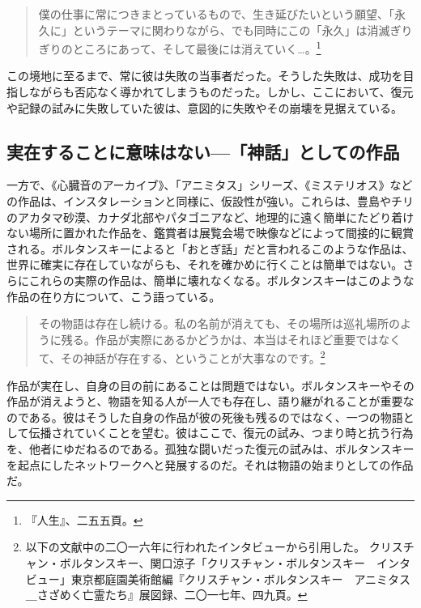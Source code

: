 \documentclass[b5j,twoside,twocolumn]{utarticle}
\begin{document}
\begin{quote}
僕の仕事に常につきまとっているもので、生き延びたいという願望、「永久に」というテーマに関わりながら、でも同時にこの「永久」は消滅ぎりぎりのところにあって、そして最後には消えていく…。\footnote{『人生』、二五五頁。}
\end{quote}


この境地に至るまで、常に彼は失敗の当事者だった。そうした失敗は、成功を目指しながらも否応なく導かれてしまうものだった。しかし、ここにおいて、復元や記録の試みに失敗していた彼は、意図的に失敗やその崩壊を見据えている。

\subsection{実在することに意味はない—「神話」としての作品}
一方で、《心臓音のアーカイブ》、「アニミタス」シリーズ、《ミステリオス》などの作品は、インスタレーションと同様に、仮設性が強い。これらは、豊島やチリのアカタマ砂漠、カナダ北部やパタゴニアなど、地理的に遠く簡単にたどり着けない場所に置かれた作品を、鑑賞者は展覧会場で映像などによって間接的に観賞される。ボルタンスキーによると「おとぎ話」だと言われるこのような作品は、世界に確実に存在していながらも、それを確かめに行くことは簡単ではない。さらにこれらの実際の作品は、簡単に壊れなくなる。ボルタンスキーはこのような作品の在り方について、こう語っている。
\begin{quote}
その物語は存在し続ける。私の名前が消えても、その場所は巡礼場所のように残る。作品が実際にあるかどうかは、本当はそれほど重要ではなくて、その神話が存在する、ということが大事なのです。\footnote{以下の文献中の二〇一六年に行われたインタビューから引用した。
クリスチャン・ボルタンスキー、関口涼子「クリスチャン・ボルタンスキー　インタビュー」東京都庭園美術館編『クリスチャン・ボルタンスキー　アニミタス＿さざめく亡霊たち』展図録、二〇一七年、四九頁。}
\end{quote}


作品が実在し、自身の目の前にあることは問題ではない。ボルタンスキーやその作品が消えようと、物語を知る人が一人でも存在し、語り継がれることが重要なのである。彼はそうした自身の作品が彼の死後も残るのではなく、一つの物語として伝播されていくことを望む。彼はここで、復元の試み、つまり時と抗う行為を、他者にゆだねるのである。孤独な闘いだった復元の試みは、ボルタンスキーを起点にしたネットワークへと発展するのだ。それは物語の始まりとしての作品だ。
\end{document}
